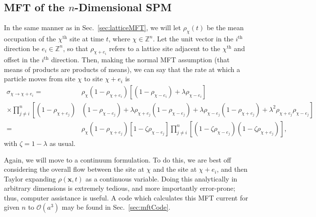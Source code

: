\subsection{MFT of the $n$-Dimensional SPM}
In the same manner as in Sec.~\ref{sec:latticeMFT}, we will let $\rho_\chi (t)$ be the mean occupation of the $\chi^\mathrm{th}$ site
at time $t$, where $\chi \in \mathbb{Z}^n$. Let the unit vector in the $i^\mathrm{th}$
direction be $e_i \in \mathbb{Z}^n$, so that $\rho_{\chi+e_i}$ refers to a lattice site adjacent to the $\chi^\mathrm{th}$ and offset in the $i^\mathrm{th}$ direction. Then,
making the normal MFT assumption (that means of products are products of means),
we can say that the rate at which a particle moves from site $\chi$ to site $\chi+e_i$ is
\begin{equation}
\begin{aligned}
 \sigma_{\chi \rightarrow \chi + e_i} =& \rho_\chi (1 - \rho_{\chi+e_i}) \left[ \left( 1- \rho_{\chi-e_i} \right) + \lambda \rho_{\chi-e_i} \right] \\
 \times \prod_{j \ne i}^n \left[  (1-\rho_{\chi+e_j})\right.&\left.(1-\rho_{\chi-e_j}) + \lambda\rho_{\chi+e_j}(1-\rho_{\chi-e_j}) + \lambda \rho_{\chi-e_j}(1-\rho_{\chi+e_j}) + \lambda^2 \rho_{\chi+e_j}\rho_{\chi-e_j} \right] \\
   =& \rho_\chi \left( 1 -  \rho_{\chi+e_j} \right) \left[ 1 - \zeta \rho_{\chi-e_j} \right] \prod_{j \ne i}^n 
   \left[ (1-\zeta\rho_{\chi- e_j})(1-\zeta \rho_{\chi+e_j}) \right],
\end{aligned}
\end{equation}
with $\zeta = 1 - \lambda$ as usual.

Again, we will move to a continuum formulation. To do this, we are best off considering the overall flow
between the site at $\chi$ and the site at $\chi+e_i$, and then Taylor expanding $\rho(\mathbf{x}, t)$ as a continuous
variable. Doing this analytically in arbitrary dimensions is extremely tedious, and more importantly error-prone; thus, computer assistance is useful. A code which calculates this MFT current for given $n$
to $\mathcal{O}(a^3)$ may be found in Sec.~\ref{sec:mftCode}.


